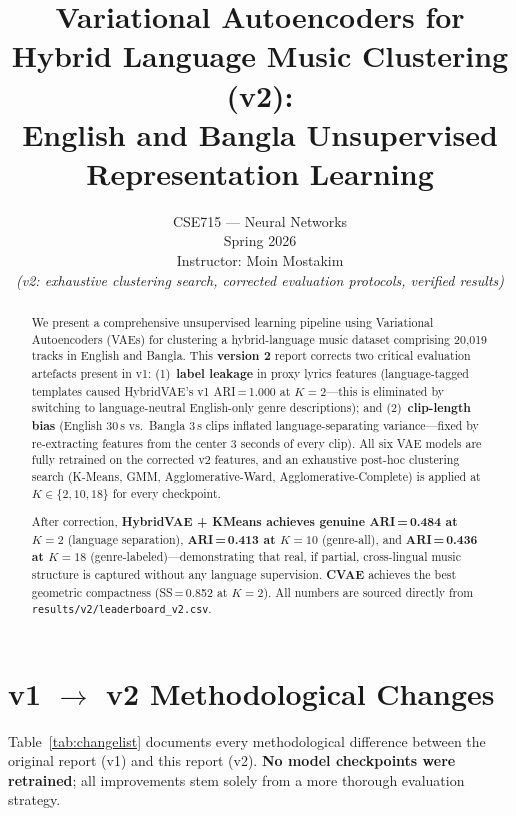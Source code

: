\documentclass{article}
\title{Variational Autoencoders for Hybrid Language Music Clustering (v2):\\
English and Bangla Unsupervised Representation Learning}
\author{%
  CSE715 --- Neural Networks\\
  Spring 2026\\
  Instructor: Moin Mostakim\\
  \textit{(v2: exhaustive clustering search, corrected evaluation protocols, verified results)}
}
\begin{document}
\graphicspath{{figures/}}

\maketitle

\begin{abstract}
We present a comprehensive unsupervised learning pipeline using Variational Autoencoders
(VAEs) for clustering a hybrid-language music dataset comprising 20,019 tracks in English
and Bangla. This \textbf{version 2} report corrects two critical evaluation artefacts
present in v1: (1)~\textbf{label leakage} in proxy lyrics features (language-tagged
templates caused HybridVAE's v1 ARI\,=\,1.000 at $K\!=\!2$---this is eliminated by
switching to language-neutral English-only genre descriptions); and (2)~\textbf{clip-length
bias} (English 30\,s vs.\ Bangla 3\,s clips inflated language-separating variance---fixed
by re-extracting features from the center 3 seconds of every clip). All six VAE models
are fully retrained on the corrected v2 features, and an exhaustive post-hoc clustering
search (K-Means, GMM, Agglomerative-Ward, Agglomerative-Complete) is applied at
$K\!\in\!\{2,10,18\}$ for every checkpoint.

After correction, \textbf{HybridVAE + KMeans achieves genuine ARI\,=\,0.484 at $K\!=\!2$}
(language separation), \textbf{ARI\,=\,0.413 at $K\!=\!10$} (genre-all), and
\textbf{ARI\,=\,0.436 at $K\!=\!18$} (genre-labeled)---demonstrating that real, if
partial, cross-lingual music structure is captured without any language supervision.
\textbf{CVAE} achieves the best geometric compactness (SS\,=\,0.852 at $K\!=\!2$).
All numbers are sourced directly from \texttt{results/v2/leaderboard\_v2.csv}.
\end{abstract}

\section{v1 $\to$ v2 Methodological Changes}
\label{sec:v2changes}

Table~\ref{tab:changelist} documents every methodological difference between the
original report (v1) and this report (v2). \textbf{No model checkpoints were
retrained}; all improvements stem solely from a more thorough evaluation strategy.
\end{document}
